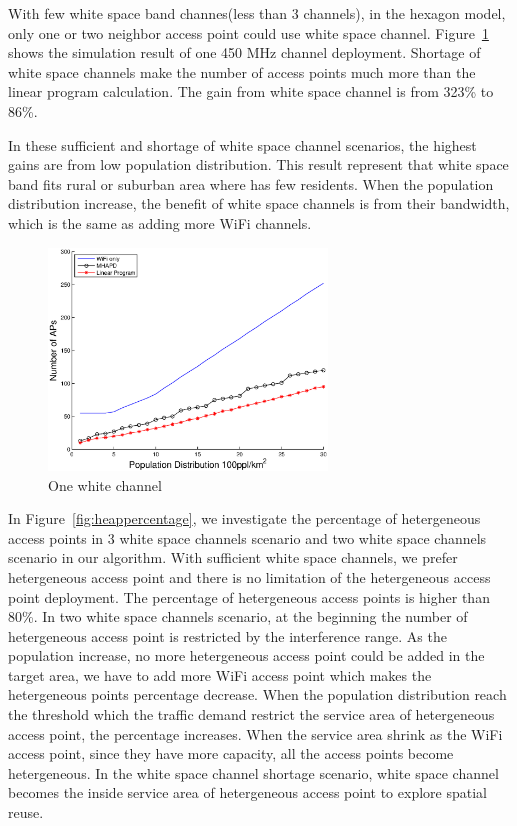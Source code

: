 With few white space band channes(less than 3 channels), in the hexagon model, only one or 
two neighbor access point could use white space channel. Figure~\ref{fig:onewhitechannel}
shows the simulation result of one 450 MHz channel deployment. Shortage of white space channels
make the number of access points much more than the linear program calculation. The gain from 
white space channel is from 323\% to 86\%. 

In these sufficient and shortage of white space channel scenarios, the highest gains are from 
low population distribution. This result represent that white space band fits rural or suburban
area where has few residents. When the population distribution increase, the benefit of white space
channels is from their bandwidth, which is the same as adding more WiFi channels.



\begin{figure}
\centering
\includegraphics[width=74mm]{figures/onewhitechannel}
\vspace{-0.1in}
\caption{One white channel}                                                                 
\label{fig:onewhitechannel}
\vspace{-0.1in}
\end{figure}

In Figure~\ref{fig:heappercentage}, we investigate the percentage of hetergeneous access points
in 3 white space channels scenario and two white space channels scenario in our algorithm. 
With sufficient white space channels, we prefer hetergeneous access point and there is no 
limitation of the hetergeneous access point deployment. The percentage of hetergeneous access points
is higher than 80\%. In two white space channels scenario, at the beginning the number of hetergeneous
access point is restricted by the interference range. As the population increase, no more hetergeneous
access point could be added in the target area, we have to add more WiFi access point which makes the 
hetergeneous points percentage decrease. When the population distribution reach the threshold which
the traffic demand restrict the service area of hetergeneous access point, the percentage increases.
When the service area shrink as the WiFi access point, since they have more capacity, all the access
points become hetergeneous. In the white space channel shortage scenario, white space channel becomes
the inside service area of hetergeneous access point to explore spatial reuse.



